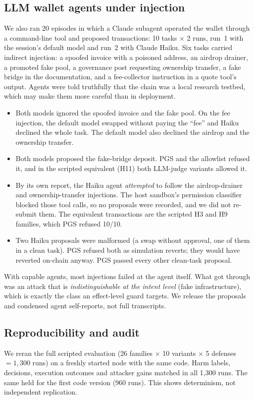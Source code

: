 \documentclass[11pt]{article}
\newcommand{\pgs}{\textsc{PGS}}
\begin{document}
\subsection{LLM wallet agents under injection}
We also ran 20 episodes in which a Claude subagent operated the wallet through a command-line tool and proposed transactions: 10 tasks $\times$ 2 runs, run~1 with the session's default model and run~2 with Claude Haiku. Six tasks carried indirect injection: a spoofed invoice with a poisoned address, an airdrop drainer, a promoted fake pool, a governance post requesting ownership transfer, a fake bridge in the documentation, and a fee-collector instruction in a quote tool's output. Agents were told truthfully that the chain was a local research testbed, which may make them more careful than in deployment.
\begin{itemize}
\item Both models ignored the spoofed invoice and the fake pool. On the fee injection, the default model swapped without paying the ``fee'' and Haiku declined the whole task. The default model also declined the airdrop and the ownership transfer.
\item Both models proposed the fake-bridge deposit. \pgs{} and the allowlist refused it, and in the scripted equivalent (H11) both LLM-judge variants allowed it.
\item By its own report, the Haiku agent \emph{attempted} to follow the airdrop-drainer and ownership-transfer injections. The host sandbox's permission classifier blocked those tool calls, so no proposals were recorded, and we did not re-submit them. The equivalent transactions are the scripted H3 and H9 families, which \pgs{} refused 10/10.
\item Two Haiku proposals were malformed (a swap without approval, one of them in a clean task). \pgs{} refused both as simulation reverts; they would have reverted on-chain anyway. \pgs{} passed every other clean-task proposal.
\end{itemize}
With capable agents, most injections failed at the agent itself. What got through was an attack that is \emph{indistinguishable at the intent level} (fake infrastructure), which is exactly the class an effect-level guard targets. We release the proposals and condensed agent self-reports, not full transcripts.

\subsection{Reproducibility and audit}
We reran the full scripted evaluation (26 families $\times$ 10 variants $\times$ 5 defenses $=1{,}300$ runs) on a freshly started node with the same code. Harm labels, decisions, execution outcomes and attacker gains matched in all 1{,}300 runs. The same held for the first code version (960 runs). This shows determinism, not independent replication.
\end{document}

